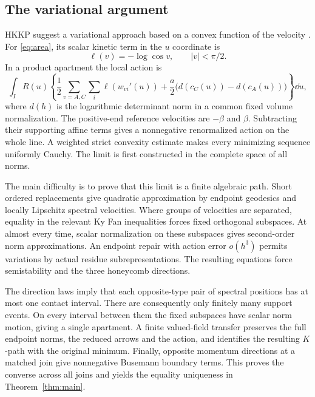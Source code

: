 \subsection{The variational argument}
HKKP suggest a variational approach based on a convex function of the
velocity \cite[p.~85]{HKKP26}. For \eqref{eq:area}, its scalar kinetic
term in the $u$ coordinate is
\[
 \ell(v)=-\log\cos v,\qquad |v|<\pi/2.
\]
In a product apartment the local action is
\begin{equation}\label{eq:introlocalaction}
 \int_I R(u)\left\{\frac12\sum_{v=A,C}\sum_i\ell(w_{vi}'(u))
       +\frac a2\bigl(d(c_C(u))-d(c_A(u))\bigr)\right\}\dd u,
\end{equation}
where $d(h)$ is the logarithmic determinant norm in a common fixed volume
normalization. The positive-end reference velocities are
$-\beta$ and $\beta$. Subtracting their supporting affine terms gives a
nonnegative renormalized action on the whole line. A weighted strict
convexity estimate makes every minimizing sequence uniformly Cauchy.
The limit is first constructed in the complete space of all norms.

The main difficulty is to prove that this limit is a finite algebraic
path. Short ordered replacements give quadratic approximation by endpoint
geodesics and locally Lipschitz spectral velocities. Where groups of
velocities are separated, equality in the relevant Ky Fan inequalities
forces fixed orthogonal subspaces. At almost every time, scalar
normalization on these subspaces gives second-order norm approximations.
An endpoint repair with action error $o(h^3)$ permits variations by actual
residue subrepresentations. The resulting equations force semistability
and the three honeycomb directions.

The direction laws imply that each opposite-type pair of spectral
positions has at most one contact interval. There are consequently only
finitely many support events. On every interval between them the fixed
subspaces have scalar norm motion, giving a single apartment. A finite
valued-field transfer preserves the full endpoint norms, the reduced
arrows and the action, and identifies the resulting $K$-path with the
original minimum. Finally, opposite momentum directions at a matched
join give nonnegative Busemann boundary terms. This proves the converse
across all joins and yields the equality uniqueness in
Theorem~\ref{thm:main}.
